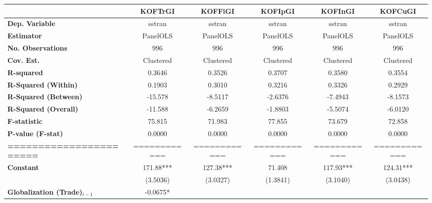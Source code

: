 \begin{center}
\begin{tabular}{lccccc}
\toprule
                                   & \textbf{KOFTrGI} & \textbf{KOFFiGI} & \textbf{KOFIpGI} & \textbf{KOFInGI} & \textbf{KOFCuGI}  \\
\midrule
\textbf{Dep. Variable}             &      sstran      &      sstran      &      sstran      &      sstran      &      sstran       \\
\textbf{Estimator}                 &     PanelOLS     &     PanelOLS     &     PanelOLS     &     PanelOLS     &     PanelOLS      \\
\textbf{No. Observations}          &       996        &       996        &       996        &       996        &       996         \\
\textbf{Cov. Est.}                 &    Clustered     &    Clustered     &    Clustered     &    Clustered     &    Clustered      \\
\textbf{R-squared}                 &      0.3646      &      0.3526      &      0.3707      &      0.3580      &      0.3554       \\
\textbf{R-Squared (Within)}        &      0.1903      &      0.3010      &      0.3216      &      0.3326      &      0.2929       \\
\textbf{R-Squared (Between)}       &     -15.578      &     -8.5117      &     -2.6376      &     -7.4943      &     -8.1573       \\
\textbf{R-Squared (Overall)}       &     -11.588      &     -6.2659      &     -1.8803      &     -5.5074      &     -6.0120       \\
\textbf{F-statistic}               &      75.815      &      71.983      &      77.855      &      73.679      &      72.858       \\
\textbf{P-value (F-stat)}          &      0.0000      &      0.0000      &      0.0000      &      0.0000      &      0.0000       \\
\textbf{=======================}   &   ============   &   ============   &   ============   &   ============   &   ============    \\
\textbf{Constant}                     &    171.88***     &    127.38***     &      71.408      &    117.93***     &    124.31***      \\
\textbf{ }                         &     (3.5036)     &     (3.0327)     &     (1.3841)     &     (3.1040)     &     (3.0438)      \\
\textbf{Globalization (Trade)$_{t-1}$}             &     -0.0675*     &                  &                  &                  &                   \\

\end{tabular}
\end{center}
